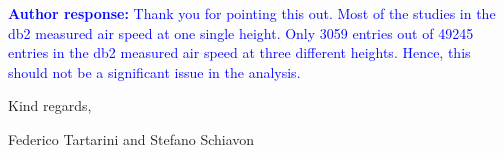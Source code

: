 \documentclass[a4paper, 10pt]{letter}
\newcommand{\response}[1]{\textcolor{blue}{\textbf{Author response:} #1}}
\begin{document}
\begin{letter}
\begin{enumerate}
            \response{
                Thank you for pointing this out.
                Most of the studies in the \ac{db2} measured air speed at one single height.
                Only \num{3059} entries out of \num{49245} entries in the \ac{db2} measured air speed at three different heights.
                Hence, this should not be a significant issue in the analysis.
            }

        \end{enumerate}

        Kind regards,

        \vspace*{5px}

        Federico Tartarini and Stefano Schiavon

    \end{letter}
\end{document}

